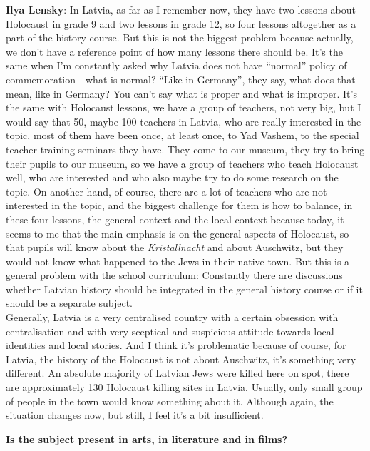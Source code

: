 \textbf{Ilya Lensky}: In Latvia, as far as I remember now, they have two lessons about Holocaust in grade 9 and two lessons in grade 12, so four lessons altogether as a part of the history course. But this is not the biggest problem because actually, we don’t have a reference point of how many lessons there should be. It's the same when I’m constantly asked why Latvia does not have ``normal'' policy of commemoration - what is normal? ``Like in Germany'', they say, what does that mean, like in Germany?  You can’t say what is proper and what is improper. It's the same with Holocaust lessons, we have a group of teachers, not very big, but I would say that 50, maybe 100 teachers in Latvia, who are really interested in the topic, most of them have been once, at least once, to Yad Vashem, to the special teacher training seminars they have. They come to our museum, they try to bring their pupils to our museum, so we have a group of teachers who teach Holocaust well, who are interested and who also maybe try to do some research on the topic. On another hand, of course, there are a lot of teachers who are not interested in the topic, and the biggest challenge for them is how to balance, in these four lessons, the general context and the local context because today, it seems to me that the main emphasis is on the general aspects of Holocaust, so that pupils will know about the \textit{Kristallnacht} and about Auschwitz, but they would not know what happened to the Jews in their native town. But this is a general problem with the school curriculum: Constantly there are discussions whether Latvian history should be integrated in the general history course or if it should be a separate subject.\\
Generally, Latvia is a very centralised country with a certain obsession with centralisation and with very sceptical and suspicious attitude towards local identities and local stories. And I think it’s problematic because of course, for Latvia, the history of the Holocaust is not about Auschwitz, it’s something very different. An absolute majority of Latvian Jews were killed here on spot, there are approximately 130 Holocaust killing sites in Latvia. Usually, only small group of people in the town would know something about it. Although again, the situation changes now, but still, I feel it’s a bit insufficient. 

\textbf{Is the subject present in arts, in literature and in films?} 

